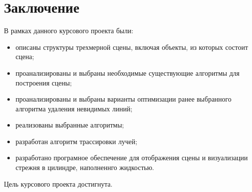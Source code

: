 \chapter*{Заключение}

В рамках данного курсового проекта были:

\begin{itemize}
	\item описаны структуры трехмерной сцены, включая объекты, из которых состоит сцена;
	\item проанализированы и выбраны необходимые существующие алгоритмы для построения сцены;
	\item проанализированы и выбраны варианты оптимизации ранее выбранного алгоритма удаления невидимых линий;
	\item реализованы выбранные алгоритмы;
	\item разработан алгоритм трассировки лучей;
	\item разработано програмное обеспечение для отображения сцены и визуализации стрежня в цилиндре, наполненнго жидкостью.
\end{itemize}


Цель курсового проекта достигнута.